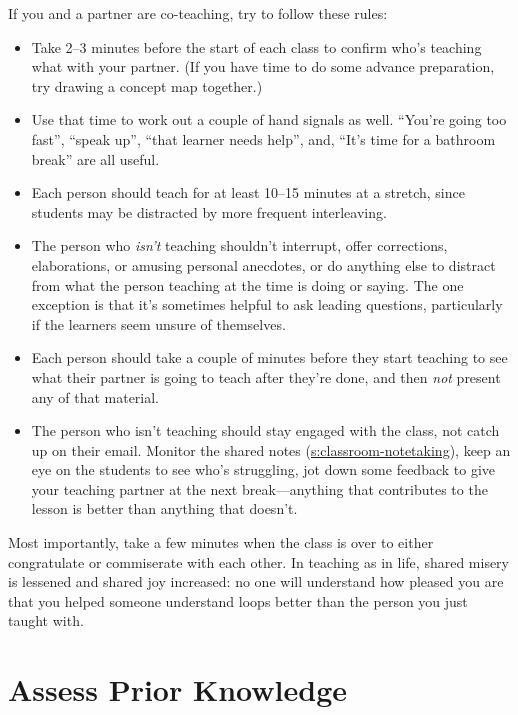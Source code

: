 If you and a partner are co-teaching, try to follow these rules:

\begin{itemize}
\item
  Take 2--3 minutes before the start of each class to confirm who's
  teaching what with your partner. (If you have time to do some
  advance preparation, try drawing a concept map together.)
\item
  Use that time to work out a couple of hand signals as well. ``You're
  going too fast'', ``speak up'', ``that learner needs help'', and, ``It's
  time for a bathroom break'' are all useful.
\item
  Each person should teach for at least 10--15 minutes at a stretch,
  since students may be distracted by more frequent interleaving.
\item
  The person who \emph{isn't} teaching shouldn't interrupt, offer
  corrections, elaborations, or amusing personal anecdotes, or do
  anything else to distract from what the person teaching at the time
  is doing or saying. The one exception is that it's sometimes helpful
  to ask leading questions, particularly if the learners seem unsure
  of themselves.
\item
  Each person should take a couple of minutes before they start
  teaching to see what their partner is going to teach after they're
  done, and then \emph{not} present any of that material.
\item
  The person who isn't teaching should stay engaged with the class,
  not catch up on their email. Monitor the shared notes
  (\protect\hyperlink{SECTION}{s:classroom-notetaking}), keep an eye on the students
  to see who's struggling, jot down some feedback to give your
  teaching partner at the next break---anything that contributes to the
  lesson is better than anything that doesn't.
\end{itemize}

Most importantly, take a few minutes when the class is over to either
congratulate or commiserate with each other. In teaching as in life,
shared misery is lessened and shared joy increased: no one will
understand how pleased you are that you helped someone understand loops
better than the person you just taught with.

\section{Assess Prior Knowledge}\label{s:classroom-prior}

